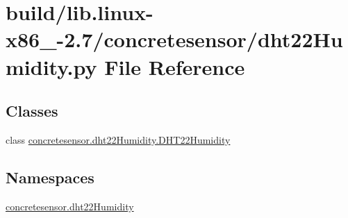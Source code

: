 \hypertarget{build_2lib_8linux-x86__64-2_87_2concretesensor_2dht22Humidity_8py}{}\section{build/lib.linux-\/x86\+\_-\/2.7/concretesensor/dht22\+Humidity.py File Reference}
\label{build_2lib_8linux-x86__64-2_87_2concretesensor_2dht22Humidity_8py}
\subsection*{Classes}
\begin{DoxyCompactItemize}
\item 
class \hyperlink{classconcretesensor_1_1dht22Humidity_1_1DHT22Humidity}{concretesensor.\+dht22\+Humidity.\+D\+H\+T22\+Humidity}
\end{DoxyCompactItemize}
\subsection*{Namespaces}
\begin{DoxyCompactItemize}
\item 
 \hyperlink{namespaceconcretesensor_1_1dht22Humidity}{concretesensor.\+dht22\+Humidity}
\end{DoxyCompactItemize}
